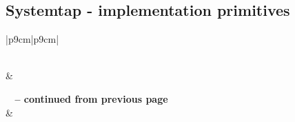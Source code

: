 \documentclass[12pt]{article}
\begin{document}
\subsection{Systemtap - implementation primitives}

\setlength\LTleft{-2.5cm}
\begin{longtable}{|p{9cm}|p{9cm}|}
\caption[]{The primitives required by the design together with Systemtap implementation solutions} \label{systemtap_impl} \\
\hline {} &  \\ \hline
\endfirsthead

%
{{\bfseries \tablename\ \thetable{} -- continued from previous page}} \\
\hline {} &  \\ \hline
\endhead

\hline {} \\ \hline
\endfoot


\end{longtable}
\end{document}

